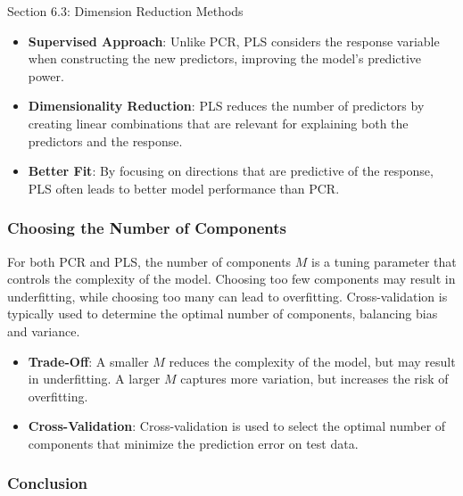 \begin{notes}{Section 6.3: Dimension Reduction Methods}
    \begin{highlight}
        \begin{itemize}
            \item \textbf{Supervised Approach}: Unlike PCR, PLS considers the response variable when constructing the new predictors, improving the model's predictive power.
            \item \textbf{Dimensionality Reduction}: PLS reduces the number of predictors by creating linear combinations that are relevant for explaining both the predictors and the response.
            \item \textbf{Better Fit}: By focusing on directions that are predictive of the response, PLS often leads to better model performance than PCR.
        \end{itemize}
    \end{highlight}
    
    \subsubsection*{Choosing the Number of Components}
    
    For both PCR and PLS, the number of components \(M\) is a tuning parameter that controls the complexity of the model. Choosing too few components may result in underfitting, while choosing too many can 
    lead to overfitting. Cross-validation is typically used to determine the optimal number of components, balancing bias and variance.
    
    \begin{highlight}
        \begin{itemize}
            \item \textbf{Trade-Off}: A smaller \(M\) reduces the complexity of the model, but may result in underfitting. A larger \(M\) captures more variation, but increases the risk of overfitting.
            \item \textbf{Cross-Validation}: Cross-validation is used to select the optimal number of components that minimize the prediction error on test data.
        \end{itemize}
    \end{highlight}
    
    \subsubsection*{Conclusion}
    

\end{notes}
